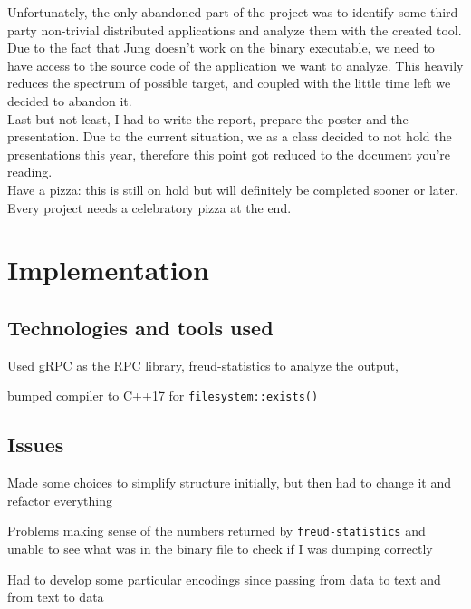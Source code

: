         Unfortunately, the only abandoned part of the project was to identify some third-party non-trivial
        distributed applications and analyze them with the created tool. Due to the fact that Jung doesn't work 
        on the binary executable, we need to have access to the source code of the application we want to 
        analyze. This heavily reduces the spectrum of possible target, and coupled with the little time left we
        decided to abandon it.\\

        Last but not least, I had to write the report, prepare the poster and the presentation. Due to the current
        situation, we as a class decided to not hold the presentations this year, therefore this point got reduced
        to the document you're reading.\\
        
        Have a pizza: this is still on hold but will definitely be completed sooner or later. Every project needs
        a celebratory pizza at the end.
        

\chapter{Implementation}
    
    \section{Technologies and tools used}

        Used gRPC \cite{gRPCdocs} as the RPC library, 
        freud-statistics \cite{freud} to analyze the output,
        
        bumped compiler to C++17 for \texttt{filesystem::exists()}

    \section{Issues}

        Made some choices to simplify structure initially, but then had to change it and
        refactor everything

        Problems making sense of the numbers returned by \texttt{freud-statistics} and unable
        to see what was in the binary file to check if I was dumping correctly

        Had to develop some particular encodings since passing from data to text and from text
        to data

